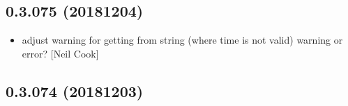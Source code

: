 \documentclass[a4paper,10pt,english]{report}
\begin{document}
\subsection{0.3.075 (2018\sphinxhyphen{}12\sphinxhyphen{}04)}
\label{\detokenize{misc/changelog:id266}}\begin{itemize}
\item {} 
 \sphinxhyphen{} adjust warning for getting  from string
(where time is not valid) \sphinxhyphen{} warning or error? {[}Neil Cook{]}

\end{itemize}


\subsection{0.3.074 (2018\sphinxhyphen{}12\sphinxhyphen{}03)}
\end{document}
